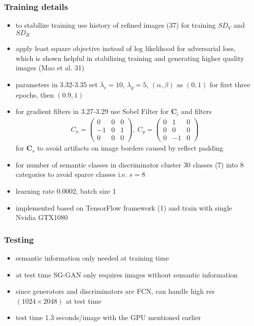 \subsubsection{Training details}
\begin{itemize}
	\item to stabilize training use history of refined images (37) for training $SD_V$ and $SD_R$
	\item apply least square objective instead of log likelihood for adversarial loss, which is shown helpful in stabilizing training and generating higher quality images (Mao et al. 31)
	\item parameters in 3.32-3.35 set $\lambda_c = 10$, $\lambda_g = 5$, $(\alpha, \beta)$ as $(0,1)$ for first three epochs, then $(0.9, 1)$
	\item for gradient filters in 3.27-3.29 use Sobel Filter for $\mathbf{C}_i$ and filters 
	\begin{align}
		C_x = 
		\begin{pmatrix}
		0 & 0 & 0 \\
		-1 & 0 & 1\\
		0 & 0 & 0
		\end{pmatrix}
		,~
		C_y =
		\begin{pmatrix}
		0 & 1 & 0 \\
		0 & 0 & 0 \\
		0 & -1 & 0
		\end{pmatrix}
	\end{align}
	for $\mathbf{C}_s$ to avoid artifacts on image borders caused by reflect padding
	\item for number of semantic classes in discriminator cluster 30 classes (7) into 8 categories to avoid sparce classes i.e. $s = 8$
	\item learning rate 0.0002, batch size 1
	\item implemented based on TensorFlow framework (1) and train with single Nvidia GTX1080
\end{itemize}

\subsubsection{Testing}
\begin{itemize}
	\item semantic information only needed at training time
	\item at test time SG-GAN only requires images without semantic information
	\item since generators and discriminators are FCN, can handle high res $(1024 \times 2048)$ at test time
	\item test time 1.3 seconds/image with the GPU mentioned earlier
\end{itemize}

